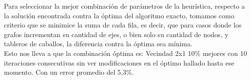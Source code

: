 \newpage

Para seleccionar la mejor combinaci\'on de par\'ametros de la heur\'istica, respecto a la soluci\'on encontrada contra la \'optima del algoritmo exacto, tomamos como criterio que se minimice la suma de cada fila, es decir, que para casos donde los grafos incrementan su cantidad de ejes, o bien solo su cantidad de nodos, y tableros de caballos, la diferencia contra la \'optima sea m\'inima.\\

Esto nos lleva a que la combinaci\'on \'optima es: Vecindad 2x1 10\% mejores con 10 iteraciones consecutivas sin ver modificaciones en el \'optimo hallado hasta ese momento. Con un error promedio del 5,3\%.


